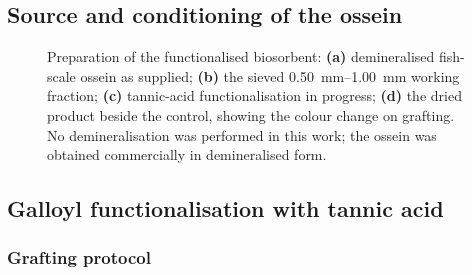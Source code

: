 \subsection{Source and conditioning of the ossein}
\label{sec:ossein}
%

\begin{figure}[htbp]
  \centering
  \caption[Preparation of the functionalised biosorbent]{Preparation of the functionalised biosorbent: \textbf{(a)} demineralised fish-scale ossein as supplied; \textbf{(b)} the sieved \SIrange{0.50}{1.00}{\milli\metre} working fraction; \textbf{(c)} tannic-acid functionalisation in progress; \textbf{(d)} the dried \TAOSS{} product beside the \RAWOSS{} control, showing the colour change on grafting. No demineralisation was performed in this work; the ossein was obtained commercially in demineralised form.}
  \label{fig:process-flow}
\end{figure}

\subsection{Galloyl functionalisation with tannic acid}
\label{sec:functionalisation}

\subsubsection{Grafting protocol}
\label{sec:grafting}
%

